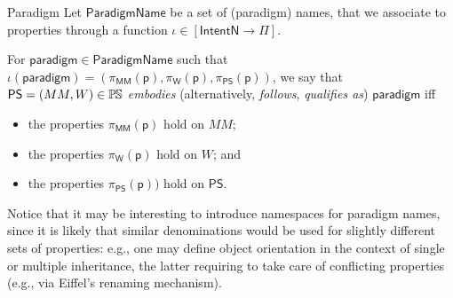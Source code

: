 \begin{Definition}{\label{def:Paradigm}Paradigm}
Let $\mathsf{ParadigmName}$ be a set of (paradigm) names, that we associate to 
properties through a function $\iota \in [\mathsf{IntentN} \to \Pi]$.

For $\mathsf{paradigm}\in\mathsf{ParadigmName}$ such that 
$\iota(\mathsf{paradigm}) = (\pi_{\mathsf{MM}}(\mathsf{p}),                     
 \pi_{\mathsf{W}}(\mathsf{p}),                      
\pi_{\mathsf{PS}}(\mathsf{p}))$, 
we say that $\mathsf{PS} = (MM, W)\in\mathbb{P}\mskip-1mu\mathbb{S}$ \emph{embodies} (alternatively, 
\emph{follows}, \emph{qualifies as}) $\mathsf{paradigm}$ iff
\begin{itemize}
   \item the properties $\pi_{\mathsf{MM}}(\mathsf{p})$ hold on $MM$;
   \item the properties $\pi_{\mathsf{W}}(\mathsf{p})$ hold on $W$; and
   \item the properties $ \pi_{\mathsf{PS}}(\mathsf{p}))$ hold on $\mathsf{PS}$.
\end{itemize}
\end{Definition}
Notice that it may be interesting to introduce namespaces for paradigm names, 
since it is likely that similar denominations would be used for slightly 
different sets of properties: e.g., one may define object orientation in 
the context of single or multiple inheritance, the latter requiring to take 
care of conflicting properties (e.g., via Eiffel's renaming mechanism).

